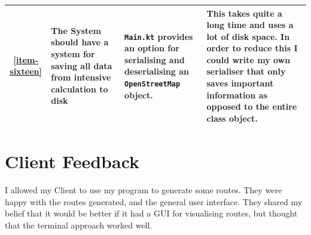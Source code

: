 \documentclass[11pt,twoside,a4paper]{report}
\begin{document}
\begin{longtable}[c]{|c|p{3cm}|p{5cm}|p{5cm}|}
    \hline
    \ref{item-sixteen} & The System should have a system for saving all data from intensive calculation to disk & \texttt{Main.kt} provides an option for serialising and deserialising an \texttt{OpenStreetMap} object. & This takes quite a long time and uses a lot of disk space. In order to reduce this I could write my own serialiser that only saves important information as opposed to the entire class object.\\
    \hline
\end{longtable}
\section{Client Feedback}
I allowed my Client to use my program to generate some routes. They were happy with the routes generated, and the general user interface. They shared my belief that it would be better if it had a GUI for visualising routes, but thought that the terminal approach worked well.
\newpage
\appendix
\appendixpage
\addappheadtotoc
\end{document}
